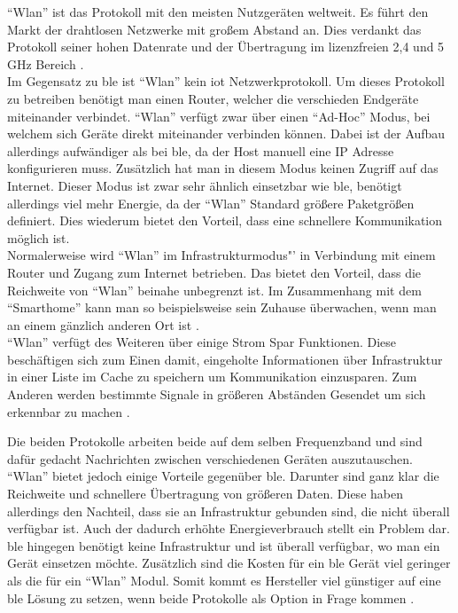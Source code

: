 "`Wlan"' ist das Protokoll mit den meisten Nutzgeräten weltweit. Es führt den Markt der drahtlosen Netzwerke mit großem Abstand an. Dies verdankt das Protokoll seiner hohen Datenrate und der Übertragung im lizenzfreien 2,4 und 5 GHz Bereich \cite[Seite 193f]{Gessler14:WNN}.\\

\noindent Im Gegensatz zu \ac{ble} ist "`Wlan"' kein \ac{iot} Netzwerkprotokoll. Um dieses Protokoll zu betreiben benötigt man einen Router, welcher die verschieden Endgeräte miteinander verbindet. "`Wlan"' verfügt zwar über einen "`Ad-Hoc"' Modus, bei welchem sich Geräte direkt miteinander verbinden können. Dabei ist der Aufbau allerdings aufwändiger als bei \ac{ble}, da der Host manuell eine IP Adresse konfigurieren muss. Zusätzlich hat man in diesem Modus keinen Zugriff auf das Internet. Dieser Modus ist zwar sehr ähnlich einsetzbar wie \ac{ble}, benötigt allerdings viel mehr Energie, da der "`Wlan"' Standard größere Paketgrößen definiert. Dies wiederum bietet den Vorteil, dass eine schnellere Kommunikation möglich ist.\\

\noindent Normalerweise wird "`Wlan"' im Infrastrukturmodus"' in Verbindung mit einem Router und Zugang zum Internet betrieben. Das bietet den Vorteil, dass die Reichweite von "`Wlan"' beinahe unbegrenzt ist. Im Zusammenhang mit dem "`Smarthome"' kann man so beispielsweise sein Zuhause überwachen, wenn man an einem gänzlich anderen Ort ist \cite{MUE:Wlan}.\\

\noindent "`Wlan"' verfügt des Weiteren über einige Strom Spar Funktionen. Diese beschäftigen sich zum Einen damit, eingeholte Informationen über Infrastruktur in einer Liste im Cache zu speichern um Kommunikation einzusparen. Zum Anderen werden bestimmte Signale in größeren Abständen Gesendet um sich erkennbar zu machen \cite[Seite 242]{Gessler14:WNN}.

\noindent Die beiden Protokolle arbeiten beide auf dem selben Frequenzband und sind dafür gedacht Nachrichten zwischen verschiedenen Geräten auszutauschen. "`Wlan"' bietet jedoch einige Vorteile gegenüber \ac{ble}. Darunter sind ganz klar die Reichweite und schnellere Übertragung von größeren Daten. Diese haben allerdings den Nachteil, dass sie an Infrastruktur gebunden sind, die nicht überall verfügbar ist. Auch der dadurch erhöhte Energieverbrauch stellt ein Problem dar. \ac{ble} hingegen benötigt keine Infrastruktur und ist überall verfügbar, wo man ein Gerät einsetzen möchte. Zusätzlich sind die Kosten für ein \ac{ble} Gerät viel geringer als die für ein "`Wlan"' Modul. Somit kommt es Hersteller viel günstiger auf eine \ac{ble} Lösung zu setzen, wenn beide Protokolle als Option in Frage kommen \cite[Seite 271]{Gessler14:WNN}.\\ 

